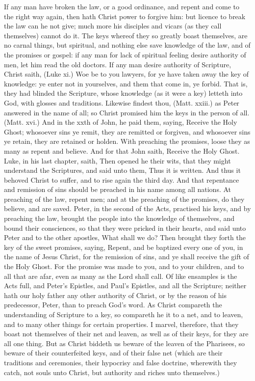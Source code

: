 If any man have broken the law, or a good ordinance, 
and repent and come to the right way again, then hath 
Christ power to forgive him: but licence to break the 
law can he not give; much more his disciples and vicars 
(as they call themselves) cannot do it. The keys whereof 
they so greatly boast themselves, are no carnal things, but 
spiritual, and nothing else save knowledge of the law, 
and of the promises or gospel: if any man for lack of 
spiritual feeling desire authority of men, let him read the 
old doctors. If any man desire authority of Scripture, 
Christ saith, (Luke xi.) Woe be to you lawyers, for ye 
have taken away the key of knowledge: ye enter not in 
yourselves, and them that come in, ye forbid. That is, 
they had blinded the Scripture, whose knowledge (as it 
were a key) letteth into God, with glosses and traditions. 
Likewise findest thou, (Matt. xxiii.) as Peter answered 
in the name of all; so Christ promised him the keys in 
the person of all. (Matt. xvi.) And in the xxth of John, 
he paid them, saying, Receive the Holy Ghost; whosoever
sins ye remit, they are remitted or forgiven, and 
whosoever sins ye retain, they are retained or holden. 
With preaching the promises, loose they as many as repent
and believe. And for that John saith, Receive the 
Holy Ghost. Luke, in his last chapter, saith, Then 
opened he their wits, that they might understand the 
Scriptures, and said unto them, Thus it is written. And 
thus it behoved Christ to suffer, and to rise again the 
third day. And that repentance and remission of sins 
should be preached in his name among all nations. At 
preaching of the law, repent men; and at the preaching 
of the promises, do they believe, and are saved. Peter, 
in the second of the Acts, practised his keys, and by 
preaching the law, brought the people into the knowledge 
of themselves, and bound their consciences, so that they 
were pricked in their hearts, and said unto Peter and to 
the other apostles, What shall we do? Then brought 
they forth the key of the sweet promises, saying, Repent,
and be baptized every one of you, in the name of Jesus 
Christ, for the remission of sins, and ye shall receive the 
gift of the Holy Ghost. For the promise was made to 
you, and to your children, and to all that are afar, even 
as many as the Lord shall call. Of like ensamples is the 
Acts full, and Peter's Epistles, and Paul's Epistles, and 
all the Scripture; neither hath our holy father any other 
authority of Christ, or by the reason of his predecessor, 
Peter, than to preach God's word. As Christ compareth
the understanding of Scripture to a key, so 
compareth he it to a net, and to leaven, and to 
many other things for certain properties. I marvel, therefore,
that they boast not themselves of their net and 
leaven, as well as of their keys, for they are all one thing. 
But as Christ biddeth us beware of the leaven of the 
Pharisees, so beware of their counterfeited keys, and of 
their false net (which are their traditions and ceremonies, 
their hypocrisy and false doctrine, wherewith they catch, not 
souls unto Christ, but authority and riches unto themselves.) 

